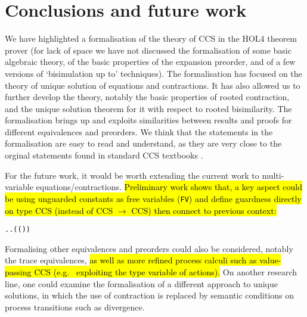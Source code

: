 
\section{Conclusions and future work}
\label{s:concl}

We have highlighted a formalisation of the theory of CCS in the 
HOL4 theorem prover (for lack of space we have not discussed 
the formalisation of some basic algebraic theory, of the basic
properties of the expansion preorder,   and of a few
 versions of `bisimulation up to'
techniques). %
The formalisation has focused on the theory of
unique solution of equations and contractions. 
It has also allowed us to further develop the theory,
notably the basic properties of rooted contraction, and the unique
solution theorem for it with respect to rooted bisimilarity. 
The formalisation brings up and exploits similarities between results
and proofs for different equivalences and preorders. 
We think that the statements in the formalisation are easy to read and
understand, as they are very close to the orginal statements found in
standard CCS textbooks \cite{Gorrieri:2015jt,Mil89}.

For the future work, it would be worth extending the current work
to multi-variable equations/contractions. \hl{Preliminary work shows that,
a key aspect could be using unguarded constants as free variables
(\texttt{FV}) and define guardness directly on type CCS (instead of CCS
$\rightarrow$ CCS) then connect to previous context:}
\begin{alltt}
\HOLTokenTurnstile{}   \HOLSymConst{\HOLTokenEquiv{}}
   \HOLSymConst{\HOLTokenForall{}}.  \HOLSymConst{\HOLTokenIn{}}   \HOLSymConst{\HOLTokenImp{}} \HOLSymConst{\HOLTokenForall{}}.   \HOLSymConst{\HOLTokenConj{}} ( ( ) \HOLSymConst{=} ) \HOLSymConst{\HOLTokenImp{}}  
\end{alltt}

Formalising other equivalences and preorders could also be considered,
notably the trace equivalences, \hl{as well as more refined process
calculi such as value-passing CCS (e.g.~ exploiting the type variable
of actions).}
%
On another research line, one could examine the formalisation of a different
approach \cite{DurierHS17} to unique
solutions, in which the use of contraction is
replaced by semantic conditions on process transitions such as
divergence.

